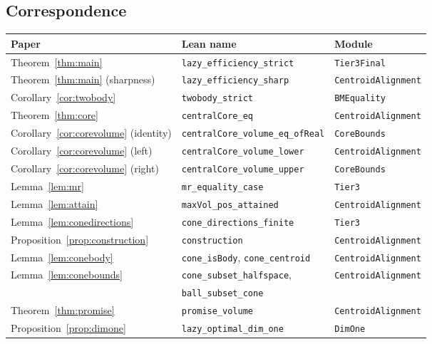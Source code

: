 \documentclass[12pt]{article}
\theoremstyle{definition}
\begin{document}
\subsection{Correspondence}\label{app:table}

\begin{center}
\begin{tabular}{lll}
\hline
Paper & Lean name & Module\\
\hline
Theorem~\ref{thm:main} & \texttt{lazy\_efficiency\_strict} & \texttt{Tier3Final}\\
Theorem~\ref{thm:main} (sharpness) & \texttt{lazy\_efficiency\_sharp} & \texttt{CentroidAlignment}\\
Corollary~\ref{cor:twobody} & \texttt{twobody\_strict} & \texttt{BMEquality}\\
Theorem~\ref{thm:core} & \texttt{centralCore\_eq} & \texttt{CentroidAlignment}\\
Corollary~\ref{cor:corevolume} (identity) & \texttt{centralCore\_volume\_eq\_ofReal} & \texttt{CoreBounds}\\
Corollary~\ref{cor:corevolume} (left) & \texttt{centralCore\_volume\_lower} & \texttt{CentroidAlignment}\\
Corollary~\ref{cor:corevolume} (right) & \texttt{centralCore\_volume\_upper} & \texttt{CoreBounds}\\
Lemma~\ref{lem:mr} & \texttt{mr\_equality\_case} & \texttt{Tier3}\\
Lemma~\ref{lem:attain} & \texttt{maxVol\_pos\_attained} & \texttt{CentroidAlignment}\\
Lemma~\ref{lem:conedirections} & \texttt{cone\_directions\_finite} & \texttt{Tier3}\\
Proposition~\ref{prop:construction} & \texttt{construction} & \texttt{CentroidAlignment}\\
Lemma~\ref{lem:conebody} & \texttt{cone\_isBody}, \texttt{cone\_centroid} & \texttt{CentroidAlignment}\\
Lemma~\ref{lem:conebounds} & \texttt{cone\_subset\_halfspace}, & \texttt{CentroidAlignment}\\
 & \texttt{ball\_subset\_cone} & \\
Theorem~\ref{thm:promise} & \texttt{promise\_volume} & \texttt{CentroidAlignment}\\
Proposition~\ref{prop:dimone} & \texttt{lazy\_optimal\_dim\_one} & \texttt{DimOne}\\
\hline
\end{tabular}
\end{center}
\end{document}
